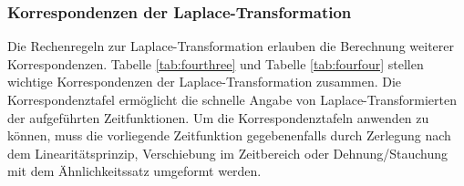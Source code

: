 \subsubsection{Korrespondenzen der Laplace-Transformation}

\noindent Die Rechenregeln zur Laplace-Transformation erlauben die Berechnung weiterer Korrespondenzen.
Tabelle \ref{tab:fourthree} und Tabelle \ref{tab:fourfour} stellen wichtige Korrespondenzen der Laplace-Transformation zusammen.
Die Korrespondenztafel ermöglicht die schnelle Angabe von Laplace-Transformierten der aufgeführten Zeitfunktionen. Um die Korrespondenztafeln anwenden zu können, muss die vorliegende Zeitfunktion gegebenenfalls durch Zerlegung nach dem Linearitätsprinzip, Verschiebung im Zeitbereich oder Dehnung/Stauchung mit dem Ähnlichkeitssatz umgeformt werden.

\clearpage

